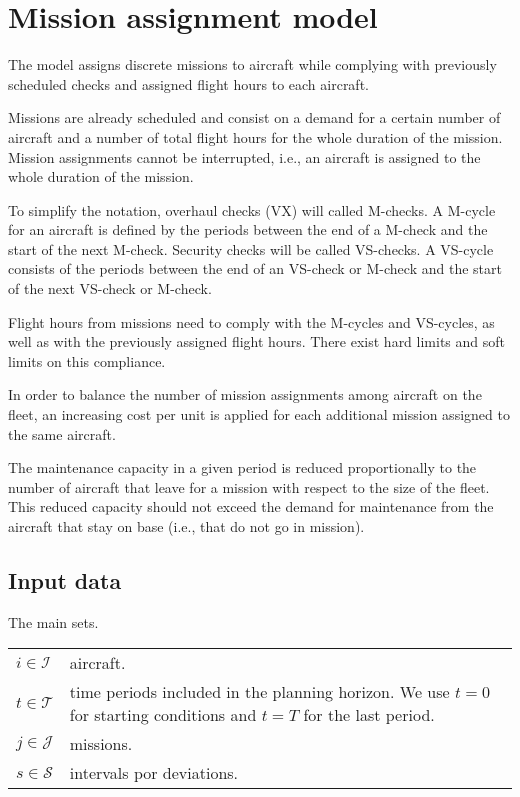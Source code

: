 \chapter{Mission assignment model}

The model assigns discrete missions to aircraft while complying with previously scheduled checks and assigned flight hours to each aircraft.

Missions are already scheduled and consist on a demand for a certain number of aircraft and a number of total flight hours for the whole duration of the mission. Mission assignments cannot be interrupted, i.e., an aircraft is assigned to the whole duration of the mission.

To simplify the notation, overhaul checks (VX) will called M-checks. A M-cycle for an aircraft is defined by the periods between the end of a M-check and the start of the next M-check. Security checks will be called VS-checks. A VS-cycle consists of the periods between the end of an VS-check or M-check and the start of the next VS-check or M-check.

Flight hours from missions need to comply with the M-cycles and VS-cycles, as well as with the previously assigned flight hours. There exist hard limits and soft limits on this compliance.

In order to balance the number of mission assignments among aircraft on the fleet, an increasing cost per unit is applied for each additional mission assigned to the same aircraft.

The maintenance capacity in a given period is reduced proportionally to the number of aircraft that leave for a mission with respect to the size of the fleet. This reduced capacity should not exceed the demand for maintenance from the aircraft that stay on base (i.e., that do not go in mission).


\section{Input data}

The main sets.

  \begin{tabular}{p{20mm}p{120mm}}
    $i \in \mathcal{I}$     &  aircraft.    \\
    $t \in \mathcal{T}$     &  time periods included in the planning horizon. We use $t=0$ for starting conditions and $t=T$ for the last period. \\
    $j \in \mathcal{J}$     &  missions. \\
    $s \in \mathcal{S}$     &  intervals por deviations.
  \end{tabular}

